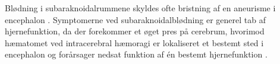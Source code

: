 Blødning i subaraknoidalrummene skyldes ofte bristning af en aneurisme i encephalon \cite{Schulze2011}. Symptomerne ved subaraknoidalblødning er generel tab af hjernefunktion, da der forekommer et øget pres på cerebrum, hvorimod hæmatomet ved intracerebral hæmoragi er lokaliseret et bestemt sted i encephalon og forårsager nedsat funktion af én bestemt hjernefunktion \cite{Caplan2006}. 

